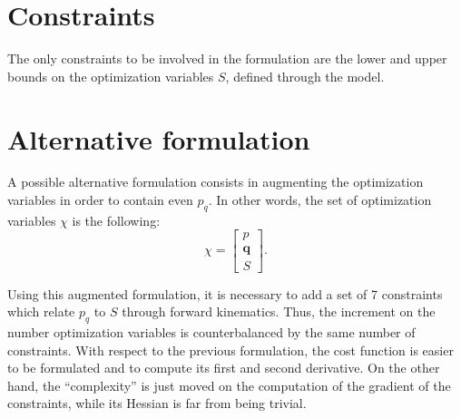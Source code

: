 \section{Constraints}
The only constraints to be involved in the formulation are the lower and upper bounds on the optimization variables $S$, defined through the model.

\section{Alternative formulation}
A possible alternative formulation consists in augmenting the optimization variables in order to contain even $p_q$. In other words, the set of optimization variables $\chi$ is the following:
\begin{equation}
\chi = \begin{bmatrix}
p\\
\textbf{q}\\
S
\end{bmatrix}.
\end{equation}

Using this augmented formulation, it is necessary to add a set of 7 constraints which relate $p_q$ to $S$ through forward kinematics. Thus, the increment on the number optimization variables is counterbalanced by the same number of constraints. With respect to the previous formulation, the cost function is easier to be formulated and to compute its first and second derivative. On the other hand, the ``complexity'' is just moved on the computation of the gradient of the constraints, while its Hessian is far from being trivial.